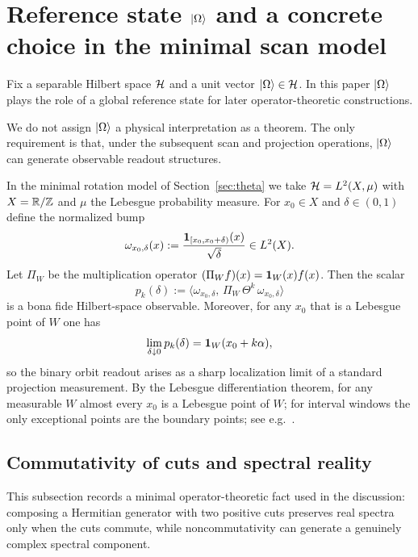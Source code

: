 \section{Reference state \texorpdfstring{$|\Omega\rangle$}{|Omega>} and a concrete choice in the minimal scan model}
\label{app:reference_state}

Fix a separable Hilbert space $\mathcal{H}$ and a unit vector $|\Omega\rangle\in\mathcal{H}$. In this paper $|\Omega\rangle$ plays the role of a global reference state for later operator-theoretic constructions.

We do not assign $|\Omega\rangle$ a physical interpretation as a theorem. The only requirement is that, under the subsequent scan and projection operations, $|\Omega\rangle$ can generate observable readout structures.

\begin{remark}
\label{rem:omega_choice}
In the minimal rotation model of Section~\ref{sec:theta} we take $\mathcal{H}=L^2(X,\mu)$ with $X=\mathbb{R}/\mathbb{Z}$ and $\mu$ the Lebesgue probability measure. For $x_0\in X$ and $\delta\in(0,1)$ define the normalized bump
$$
\omega_{x_0,\delta}(x):=\frac{\mathbf{1}_{[x_0,x_0+\delta)}(x)}{\sqrt{\delta}}\in L^2(X).
$$
Let $\Pi_W$ be the multiplication operator $(\Pi_W f)(x)=\mathbf{1}_W(x)f(x)$. Then the scalar
$$
p_k(\delta):=\langle \omega_{x_0,\delta},\,\Pi_W\,\Theta^k\,\omega_{x_0,\delta}\rangle
$$
is a bona fide Hilbert-space observable. Moreover, for any $x_0$ that is a Lebesgue point of $W$ one has
$$
\lim_{\delta\downarrow 0} p_k(\delta)=\mathbf{1}_W(x_0+k\alpha),
$$
so the binary orbit readout arises as a sharp localization limit of a standard projection measurement. By the Lebesgue differentiation theorem, for any measurable $W$ almost every $x_0$ is a Lebesgue point of $W$; for interval windows the only exceptional points are the boundary points; see e.g.~\cite{SteinShakarchi2005}.
\end{remark}

\subsection{Commutativity of cuts and spectral reality}
\label{app:commuting_cuts_spectra}

This subsection records a minimal operator-theoretic fact used in the discussion: composing a Hermitian generator with two positive cuts preserves real spectra only when the cuts commute, while noncommutativity can generate a genuinely complex spectral component.

